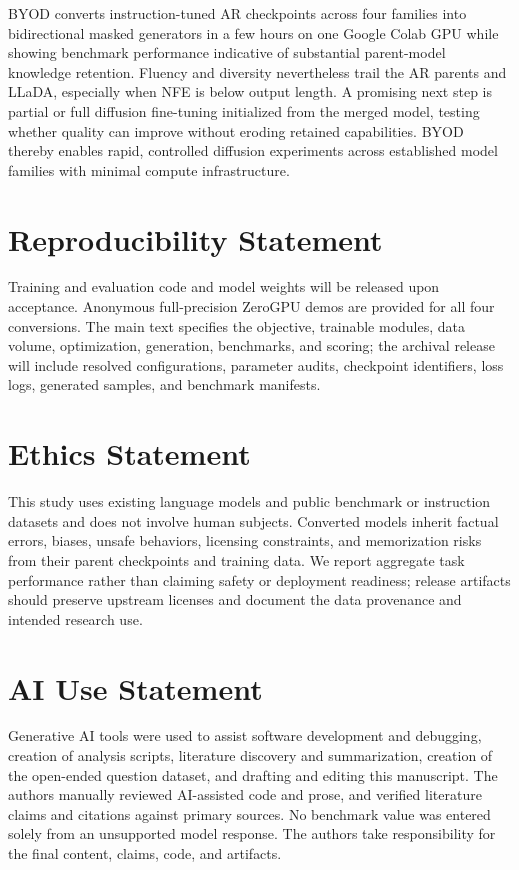 \documentclass{article}
\newcommand{\method}{BYOD}
\begin{document}
\method{} converts instruction-tuned AR checkpoints across four families into bidirectional masked generators in a few hours on one Google Colab GPU while showing benchmark performance indicative of substantial parent-model knowledge retention. Fluency and diversity nevertheless trail the AR parents and LLaDA, especially when NFE is below output length. A promising next step is partial or full diffusion fine-tuning initialized from the merged model, testing whether quality can improve without eroding retained capabilities. BYOD thereby enables rapid, controlled diffusion experiments across established model families with minimal compute infrastructure.


\section*{Reproducibility Statement}

Training and evaluation code and model weights will be released upon acceptance. Anonymous full-precision ZeroGPU demos are provided for all four conversions. The main text specifies the objective, trainable modules, data volume, optimization, generation, benchmarks, and scoring; the archival release will include resolved configurations, parameter audits, checkpoint identifiers, loss logs, generated samples, and benchmark manifests.

\section*{Ethics Statement}

This study uses existing language models and public benchmark or instruction datasets and does not involve human subjects. Converted models inherit factual errors, biases, unsafe behaviors, licensing constraints, and memorization risks from their parent checkpoints and training data. We report aggregate task performance rather than claiming safety or deployment readiness; release artifacts should preserve upstream licenses and document the data provenance and intended research use.

\section*{AI Use Statement}

Generative AI tools were used to assist software development and debugging, creation of analysis scripts, literature discovery and summarization, creation of the open-ended question dataset, and drafting and editing this manuscript. The authors manually reviewed AI-assisted code and prose, and verified literature claims and citations against primary sources. No benchmark value was entered solely from an unsupported model response. The authors take responsibility for the final content, claims, code, and artifacts.
\end{document}
